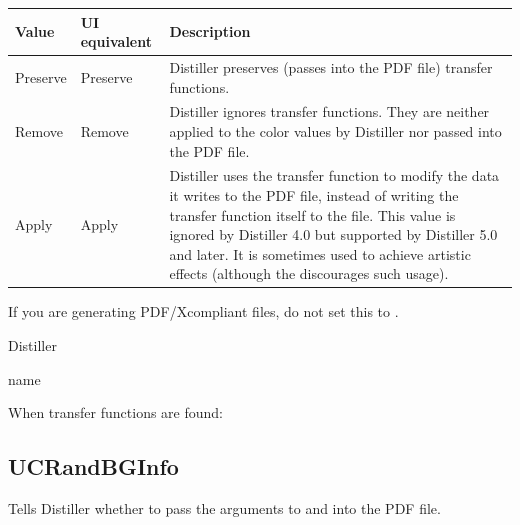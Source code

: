 \documentclass[letterpaper,12pt,english,openany,oneside]{sphinxmanual}
\begin{document}
\begin{savenotes}\sphinxattablestart
\centering
{}\label{\detokenize{PDF_Create_CommonSettings:section-17}}\nobreak
\begin{tabulary}{\linewidth}[t]{|T|T|T|}
\hline
\sphinxstyletheadfamily 
Value
&\sphinxstyletheadfamily 
UI equivalent
&\sphinxstyletheadfamily 
Description
\\
\hline
Preserve
&
Preserve
&
Distiller preserves (passes into the PDF file) transfer functions.
\\
\hline
Remove
&
Remove
&
Distiller ignores transfer functions. They are neither applied to the color values by Distiller nor passed into the PDF file.
\\
\hline
Apply
&
Apply
&
Distiller uses the transfer function to modify the data it writes to the PDF file, instead of writing the transfer function itself to the file. This value is ignored by Distiller 4.0 but supported by Distiller 5.0 and later. It is sometimes used to achieve artistic effects (although the  discourages such usage).
\\
\hline
\end{tabulary}
\par
\sphinxattableend\end{savenotes}

If you are generating PDF/X\sphinxhyphen{}compliant files, do not set this to  .

\label{\detokenize{PDF_Create_CommonSettings:supported-by-84}}

Distiller

\label{\detokenize{PDF_Create_CommonSettings:type-83}}

name

\label{\detokenize{PDF_Create_CommonSettings:ui-name-69}}

When transfer functions are found:

\label{\detokenize{PDF_Create_CommonSettings:default-value-78}}

\begin{sphinxVerbatim}[commandchars=\\\{\}]
\end{sphinxVerbatim}




\subsection{UCRandBGInfo}
\label{\detokenize{PDF_Create_CommonSettings:ucrandbginfo}}
Tells Distiller whether to pass the arguments to  and  into the PDF file.
\end{document}
